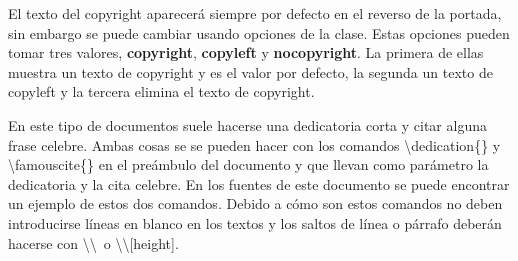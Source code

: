 El texto del copyright aparecerá siempre por defecto en el reverso de la portada, sin embargo se puede cambiar usando opciones de la clase. Estas opciones pueden tomar tres valores, \textbf{copyright}, \textbf{copyleft} y \textbf{nocopyright}. La primera de ellas muestra un texto de copyright y es el valor por defecto, la segunda un texto de copyleft y la tercera elimina el texto de copyright.

En este tipo de documentos suele hacerse una dedicatoria corta y citar alguna frase celebre. Ambas cosas se se pueden hacer con los comandos \textbackslash dedication\{\} y \textbackslash famouscite\{\} en el preámbulo del documento y que llevan como parámetro la dedicatoria y la cita celebre. En los fuentes de este documento se puede encontrar un ejemplo de estos dos comandos. Debido a cómo son estos comandos no deben introducirse líneas en blanco en los textos y los saltos de línea o párrafo deberán hacerse con \textbackslash\textbackslash\ o \textbackslash\textbackslash[height].

